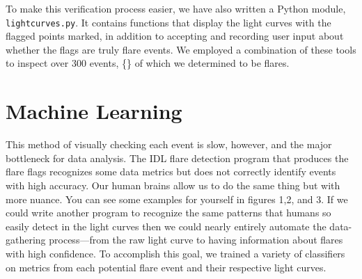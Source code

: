 \documentclass[11pt]{article}
\begin{document}
To make this verification process easier, we have also written a
Python module, \verb|lightcurves.py|.  It contains functions that
display the light curves with the flagged points marked, in addition
to accepting and recording user input about whether the flags are
truly flare events.  We employed a combination of these tools to
inspect over 300 events, \{\} of which we determined to be flares.



\section{Machine Learning}
\label{sec:ml}

This method of visually checking each event is slow, however, and the
major bottleneck for data analysis. The IDL flare detection program
that produces the flare flags recognizes some data metrics but does
not correctly identify events with high accuracy.  Our human brains
allow us to do the same thing but with more nuance.  You can see some
examples for yourself in figures 1,2, and 3.  If we could write
another program to recognize the same patterns that humans so easily
detect in the light curves then we could nearly entirely automate the
data-gathering process---from the raw light curve to having
information about flares with high confidence.  To accomplish this
goal, we trained a variety of classifiers on metrics from each
potential flare event and their respective light curves.

\end{document}
